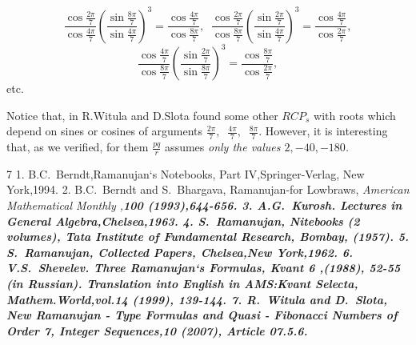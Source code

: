 \documentclass[12pt,oneside,english]{amsart}
\begin{document}
$$
\frac{\cos\frac{2\pi}{7}}{\cos\frac{4\pi}{7}}\left(\frac{\sin\frac{8\pi}{7}}
{\sin\frac{4\pi}{7}}\right)^3=\frac{\cos\frac{4\pi}{7}}{\cos\frac{8\pi}{7}},\;\;
\frac{\cos\frac{2\pi}{7}}{\cos\frac{8\pi}{7}}\left(\frac{\sin\frac{2\pi}{7}}
{\sin\frac{4\pi}{7}}\right)^3=\frac{\cos\frac{4\pi}{7}}{\cos\frac{2\pi}{7}},
$$
\begin{equation}\label{41}
\frac{\cos\frac{4\pi}{7}}{\cos\frac{8\pi}{7}}\left(\frac{\sin\frac{2\pi}{7}}
{\sin\frac{8\pi}{7}}\right)^3=
\frac{\cos\frac{8\pi}{7}}{\cos\frac{2\pi}{7}},
\end{equation}
etc.

Notice that, in \cite{7} R.Witula and D.Slota found some other
$RCP_s$ with roots which depend on sines or cosines of arguments
$\frac{2\pi}{7},\;\;\frac{4\pi}{7},\;\;\frac{8\pi}{7}$. However, it
is interesting that, as we verified, for them $\frac{pq}{r}$ assumes
\slshape only \upshape the values $2, -40, -180$.


\begin{thebibliography}{7}
 1. B.C.~Berndt,Ramanujan`s
Notebooks, Part IV,Springer-Verlag, New York,1994.
 2. B.C.~Berndt and S.~Bhargava, Ramanujan-for
Lowbraws,  \slshape American Mathematical Monthly \upshape
,\bfseries 100 \mdseries (1993),644-656.
 3. A.G.~Kurosh.
\slshape Lectures in General Algebra,\upshape Chelsea,1963.
 4. S.~Ramanujan,
\slshape Nitebooks \upshape     (2 volumes), Tata Institute of
Fundamental Research, Bombay, (1957).
 5. S.~Ramanujan, \slshape Collected Papers, \upshape
  Chelsea,New York,1962.
 6. V.S.~Shevelev. Three Ramanujan`s Formulas,
\slshape Kvant   \upshape \bfseries    6 \mdseries ,(1988), 52-55
(in Russian). Translation into English in AMS:Kvant Selecta,
\slshape   Mathem.World,\upshape vol.\bfseries 14 \mdseries (1999),
139-144.
 7. R.~Witula and D.~Slota, New Ramanujan - Type Formulas
and Quasi - Fibonacci Numbers of Order   7, \slshape Integer
Sequences,\upshape  \bfseries 10 \mdseries  (2007), Article 07.5.6.
\end{thebibliography}
\end{document}
